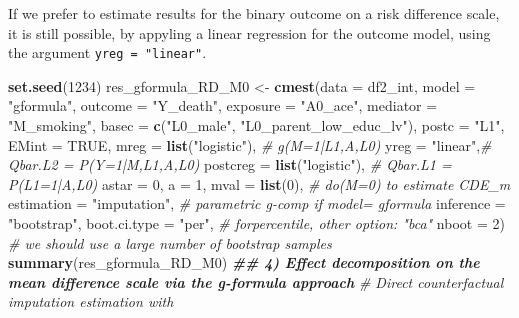 \documentclass[
]{book}
\newenvironment{Shaded}{\begin{snugshade}}{\end{snugshade}}
\newcommand{\AttributeTok}[1]{\textcolor[rgb]{0.13,0.29,0.53}{#1}}
\newcommand{\CommentTok}[1]{\textcolor[rgb]{0.56,0.35,0.01}{\textit{#1}}}
\newcommand{\ConstantTok}[1]{\textcolor[rgb]{0.56,0.35,0.01}{#1}}
\newcommand{\DecValTok}[1]{\textcolor[rgb]{0.00,0.00,0.81}{#1}}
\newcommand{\DocumentationTok}[1]{\textcolor[rgb]{0.56,0.35,0.01}{\textbf{\textit{#1}}}}
\newcommand{\FunctionTok}[1]{\textcolor[rgb]{0.13,0.29,0.53}{\textbf{#1}}}
\newcommand{\NormalTok}[1]{#1}
\newcommand{\OtherTok}[1]{\textcolor[rgb]{0.56,0.35,0.01}{#1}}
\newcommand{\StringTok}[1]{\textcolor[rgb]{0.31,0.60,0.02}{#1}}
\begin{document}
If we prefer to estimate results for the binary outcome on a risk difference scale, it is still possible, by appyling a linear regression for the outcome model, using the argument \texttt{yreg\ =\ "linear"}.

\begin{Shaded}
\begin{Highlighting}[]
\FunctionTok{set.seed}\NormalTok{(}\DecValTok{1234}\NormalTok{)}
\NormalTok{res\_gformula\_RD\_M0 }\OtherTok{\textless{}{-}} \FunctionTok{cmest}\NormalTok{(}\AttributeTok{data =}\NormalTok{ df2\_int,}
                      \AttributeTok{model =} \StringTok{"gformula"}\NormalTok{,}
                      \AttributeTok{outcome =} \StringTok{"Y\_death"}\NormalTok{,}
                      \AttributeTok{exposure =} \StringTok{"A0\_ace"}\NormalTok{,}
                      \AttributeTok{mediator =} \StringTok{"M\_smoking"}\NormalTok{,}
                      \AttributeTok{basec =} \FunctionTok{c}\NormalTok{(}\StringTok{"L0\_male"}\NormalTok{, }\StringTok{"L0\_parent\_low\_educ\_lv"}\NormalTok{),}
                      \AttributeTok{postc =} \StringTok{"L1"}\NormalTok{,}
                      \AttributeTok{EMint =} \ConstantTok{TRUE}\NormalTok{,}
                      \AttributeTok{mreg =} \FunctionTok{list}\NormalTok{(}\StringTok{"logistic"}\NormalTok{), }\CommentTok{\# g(M=1|L1,A,L0)}
                      \AttributeTok{yreg =} \StringTok{"linear"}\NormalTok{,}\CommentTok{\# Qbar.L2 = P(Y=1|M,L1,A,L0)}
                      \AttributeTok{postcreg =} \FunctionTok{list}\NormalTok{(}\StringTok{"logistic"}\NormalTok{), }\CommentTok{\# Qbar.L1 = P(L1=1|A,L0)}
                      \AttributeTok{astar =} \DecValTok{0}\NormalTok{,}
                      \AttributeTok{a =} \DecValTok{1}\NormalTok{,}
                      \AttributeTok{mval =} \FunctionTok{list}\NormalTok{(}\DecValTok{0}\NormalTok{), }\CommentTok{\# do(M=0) to estimate CDE\_m}
                      \AttributeTok{estimation =} \StringTok{"imputation"}\NormalTok{, }\CommentTok{\# parametric g{-}comp if model= gformula}
                      \AttributeTok{inference =} \StringTok{"bootstrap"}\NormalTok{,}
                      \AttributeTok{boot.ci.type =} \StringTok{"per"}\NormalTok{, }\CommentTok{\# forpercentile, other option: "bca"}
                      \AttributeTok{nboot =} \DecValTok{2}\NormalTok{) }\CommentTok{\# we should use a large number of bootstrap samples}
\FunctionTok{summary}\NormalTok{(res\_gformula\_RD\_M0)}
\DocumentationTok{\#\# 4) Effect decomposition on the mean difference scale via the g{-}formula approach}
\CommentTok{\# Direct counterfactual imputation estimation with}

\end{Highlighting}
\end{Shaded}
\end{document}
